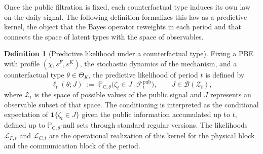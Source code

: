 \documentclass[review,authoryear,12pt]{elsarticle}
\theoremstyle{plain}
\theoremstyle{definition}
\newtheorem{definition}[theorem]{Definition}
\newcommand{\ProbC}[1]{\mathbb{P}_{\mathrm{C},#1}}
\newcommand{\ThetaK}{\Theta_K}
\newcommand{\1}{\mathbf{1}}
\begin{document}
Once the public filtration is fixed, each counterfactual type induces its own law on the daily signal. The following definition formalizes this law as a predictive kernel, the object that the Bayes operator reweights in each period and that connects the space of latent types with the space of observables.

\begin{definition}[Predictive likelihood under a counterfactual type]\label{def:predictive-likelihood}
Fixing a PBE with profile $(\chi,s^F,s^K)$, the stochastic dynamics of the mechanism, and a counterfactual type $\theta\in\ThetaK$, the predictive likelihood of period $t$ is defined by
\begin{equation}
\label{eq:likelihood-zeta}
\ell_t(\theta;J)\;:=\;\ProbC{\theta}\bigl(\zeta_t \in J \,\big|\, \mathcal{F}_t^{\mathrm{pub}}\bigr),
\qquad J\in\mathcal{B}(\mathcal{Z}_t),
\end{equation}
where $\mathcal{Z}_t$ is the space of possible values of the public signal and $J$ represents an observable subset of that space. The conditioning is interpreted as the conditional expectation of $\mathbf{1}\{\zeta_t\in J\}$ given the public information accumulated up to $t$, defined up to $\ProbC{\theta}$-null sets through standard regular versions. The likelihoods $\mathcal{L}_{F,t}$ and $\mathcal{L}_{C,t}$ are the operational realization of this kernel for the physical block and the communication block of the period.
\end{definition}
\end{document}
